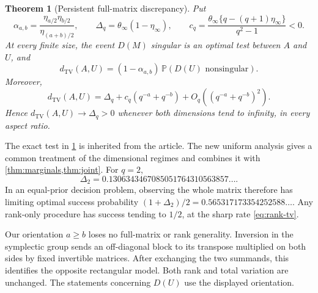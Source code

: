 \documentclass[11pt]{article}
\newtheorem{theorem}{Theorem}[section]
\theoremstyle{definition}
\newcommand{\Pbb}{\mathbb P}
\newcommand{\TV}{d_{\mathrm{TV}}}
\begin{document}
\begin{theorem}[Persistent full-matrix discrepancy]\label{thm:full}
Put
\[
 \alpha_{a,b}=\frac{\eta_{a/2}\eta_{b/2}}{\eta_{(a+b)/2}},\qquad
 \Delta_q=\theta_\infty(1-\eta_\infty),\qquad
 c_q=\frac{\theta_\infty\{q-(q+1)\eta_\infty\}}{q^2-1}<0.
\]
At every finite size, the event \(D(M)\) singular is an optimal test
between \(A\) and \(U\), and
\begin{equation}\label{eq:full-exact}
 \TV(A,U)=(1-\alpha_{a,b})\,\Pbb(D(U)\text{ nonsingular}).
\end{equation}
Moreover,
\begin{equation}\label{eq:full-asymp}
 \TV(A,U)=\Delta_q+c_q(q^{-a}+q^{-b})
                  +O_q((q^{-a}+q^{-b})^2).
\end{equation}
Hence \(\TV(A,U)\to\Delta_q>0\) whenever both dimensions tend to
infinity, in every aspect ratio.
\end{theorem}

The exact test in \cref{thm:full} is inherited from the article. The
new uniform analysis gives a common treatment of the dimensional
regimes and combines it with \cref{thm:marginals,thm:joint}.
For \(q=2\),
\[
 \Delta_2=0.1306343467085051764310563857\ldots.
\]
In an equal-prior decision problem, observing the whole matrix therefore
has limiting optimal success probability
\((1+\Delta_2)/2=0.565317173354252588\ldots\).
Any rank-only procedure has success tending to \(1/2\), at the sharp
rate \eqref{eq:rank-tv}.

Our orientation \(a\ge b\) loses no full-matrix or rank generality.
Inversion in the symplectic group sends an off-diagonal block to its
transpose multiplied on both sides by fixed invertible matrices.
After exchanging the two summands, this identifies the opposite
rectangular model. Both rank and total variation are unchanged.
The statements concerning \(D(U)\) use the displayed orientation.






\end{document}
